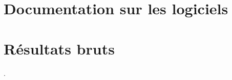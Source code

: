 \documentclass[a4paper, 12pt]{report}
\begin{document}
\begin{large}
\thispagestyle{empty}
\tableofcontents
\end{large}
\setcounter{page}{0}

\part{Documentation sur les logiciels}

\part{Résultats bruts}


\begin{large}
\thispagestyle{empty}
\listoffigures
.
\end{large}
\end{document}
